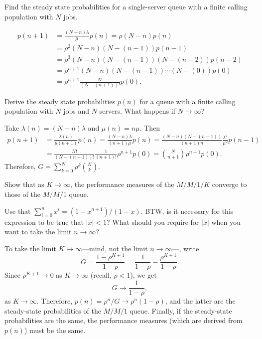 \begin{exercise}\label{ex:l-247}
Find  the steady state probabilities  for a single-server queue with a finite calling population with $N$ jobs.
\begin{solution}
 \begin{align*}
 p(n+1)
& = \frac{(N-n)\lambda}\mu p(n)
 = \rho (N-n) p(n) \\
& = \rho^2 (N-n)(N-(n-1))p(n-1) \\
& = \rho^3 (N-n)(N-(n-1))(N-(n-2)) p(n-2) \\
& = \rho^{n+1} (N-n)(N-(n-1))\cdots(N-(0)) p(0) \\
&= \rho^{n+1} \frac{N!}{(N-(n+1))!}p(0).
 \end{align*}
\end{solution}
\end{exercise}

\begin{exercise}\label{ex:33}
 Derive the steady state probabilities $p(n)$ for a queue with a finite calling population with $N$ jobs and $N$ servers.
  What happens if $N\to\infty$?
\begin{solution}
 Take $\lambda(n) = (N-n)\lambda$ and $\mu(n) = n \mu$. Then
 \begin{align*}
 p(n+1)
&= \frac{\lambda(n)}{\mu(n+1)} p(n)
= \frac{(N-n)\lambda}{(n+1)\mu} p(n)
= \frac{(N-n)(N-(n-1))}{(n+1)n}\frac{\lambda^2}{\mu^2} p(n-1) \\
&= \frac{N!}{(N-(n+1))!}\frac1{(n+1)!}\rho^{n+1} p(0)
 = {N \choose n+1}\rho^{n+1} p(0).
 \end{align*}
Therefore, $G=\sum_{k=0}^N \rho^k { N \choose k}$.
\end{solution}
\end{exercise}



\begin{exercise}\label{ex:40}
 Show that as $K\to\infty$, the performance measures of the $M/M/1/K$ converge to those of the $M/M/1$ queue.
\begin{hint}
Use that $\sum_{i=0}^n x^i = (1-x^{n+1})/(1-x)$. BTW, is it
 necessary for this expression to be true that $|x|<1$? What should
 you require for $|x|$ when you want to take the limit
 $n\to\infty$?
\end{hint}
\begin{solution}
To take the limit $K\to\infty$---mind, not the limit $n\to\infty$---, write
\begin{equation*}
G= \frac{1-\rho^{K+1}}{1-\rho} = \frac{1}{1-\rho} -\frac{\rho^{K+1}}{1-\rho}.
\end{equation*}
Since $\rho^{K+1}\to 0$ as $K\to \infty$ (recall, $\rho<1$), we get
\begin{equation*}
G \to \frac{1}{1-\rho},
\end{equation*}
as $K\to\infty$. Therefore, $p(n)=\rho^n/G \to \rho^n(1-\rho)$, and
the latter are the steady-state probabilities of the $M/M/1$
queue. Finally, if the steady-state probabilities are the same, the
performance measures (which are derived from $p(n)$) must be the same.
\end{solution}
\end{exercise}


